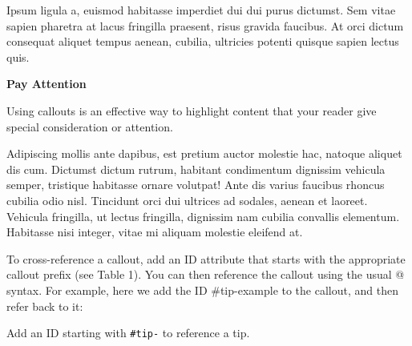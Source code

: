 \documentclass[
  brazilian,
  11pt,
  a4paper,
  open = right,
  twoside = true]{scrbook}
\newcounter{quartocallouttipno}
\newcommand{\quartocallouttip}[1]{\refstepcounter{quartocallouttipno}\label{#1}}
\begin{document}
Ipsum ligula a, euismod habitasse imperdiet dui dui purus dictumst. Sem
vitae sapien pharetra at lacus fringilla praesent, risus gravida
faucibus. At orci dictum consequat aliquet tempus aenean, cubilia,
ultricies potenti quisque sapien lectus quis.

\begin{tcolorbox}[enhanced jigsaw, arc=.35mm, bottomrule=.15mm, breakable, colback=white, colframe=quarto-callout-note-color-frame, left=2mm, leftrule=.75mm, opacityback=0, rightrule=.15mm, toprule=.15mm]
\begin{minipage}[t]{5.5mm}
\textcolor{quarto-callout-note-color}{\faInfo}
\end{minipage}%
\begin{minipage}[t]{\textwidth - 5.5mm}

\vspace{-3mm}\textbf{Pay Attention}\vspace{3mm}

Using callouts is an effective way to highlight content that your reader
give special consideration or attention.

\end{minipage}%
\end{tcolorbox}

Adipiscing mollis ante dapibus, est pretium auctor molestie hac, natoque
aliquet dis cum. Dictumst dictum rutrum, habitant condimentum dignissim
vehicula semper, tristique habitasse ornare volutpat! Ante dis varius
faucibus rhoncus cubilia odio nisl. Tincidunt orci dui ultrices ad
sodales, aenean et laoreet. Vehicula fringilla, ut lectus fringilla,
dignissim nam cubilia convallis elementum. Habitasse nisi integer, vitae
mi aliquam molestie eleifend at.

To cross-reference a callout, add an ID attribute that starts with the
appropriate callout prefix (see Table 1). You can then reference the
callout using the usual @ syntax. For example, here we add the ID
\#tip-example to the callout, and then refer back to it:

\begin{tcolorbox}[enhanced jigsaw, arc=.35mm, bottomrule=.15mm, bottomtitle=1mm, breakable, colback=white, colbacktitle=quarto-callout-tip-color!10!white, colframe=quarto-callout-tip-color-frame, coltitle=black, left=2mm, leftrule=.75mm, opacityback=0, opacitybacktitle=0.6, rightrule=.15mm, title=\textcolor{quarto-callout-tip-color}{\faLightbulb}\hspace{0.5em}{Dica \ref*{tip-example}: Cross-Referencing a Tip}, titlerule=0mm, toprule=.15mm, toptitle=1mm]

\quartocallouttip{tip-example} 

Add an ID starting with \texttt{\#tip-} to reference a tip.

\end{tcolorbox}
\end{document}

